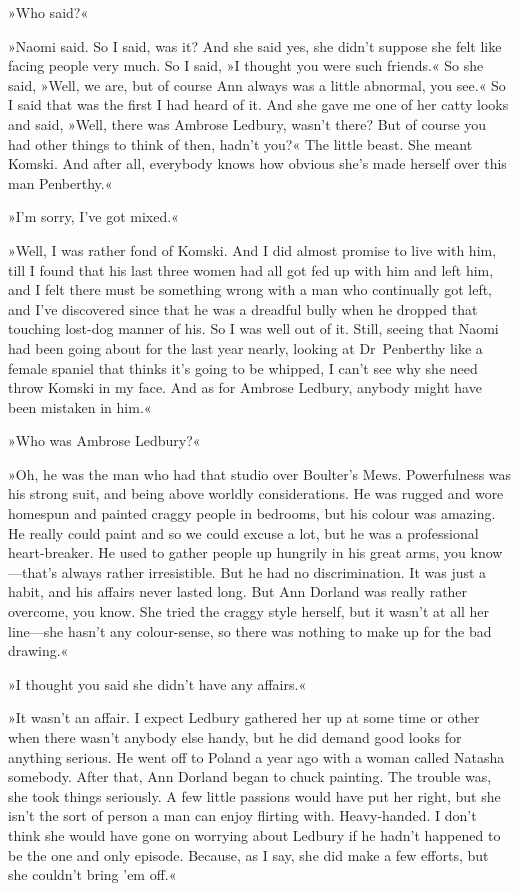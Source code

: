 »Who said?«

»Naomi said. So I said, was it? And she said yes, she didn't suppose she felt like facing people very much. So I said, »I thought you were such friends.« So she said, »Well, we are, but of course Ann always was a little abnormal, you see.« So I said that was the first I had heard of it. And she gave me one of her catty looks and said, »Well, there was Ambrose Ledbury, wasn't there? But of course you had other things to think of then, hadn't you?« The little beast. She meant Komski. And after all, everybody knows how obvious she's made herself over this man Penberthy.«

»I'm sorry, I've got mixed.«

»Well, I was rather fond of Komski. And I did almost promise to live with him, till I found that his last three women had all got fed up with him and left him, and I felt there must be something wrong with a man who continually got left, and I've discovered since that he was a dreadful bully when he dropped that touching lost-dog manner of his. So I was well out of it. Still, seeing that Naomi had been going about for the last year nearly, looking at Dr~Penberthy like a female spaniel that thinks it's going to be whipped, I can't see why she need throw Komski in my face. And as for Ambrose Ledbury, anybody might have been mistaken in him.«

»Who was Ambrose Ledbury?«

»Oh, he was the man who had that studio over Boulter's Mews. Powerfulness was his strong suit, and being above worldly considerations. He was rugged and wore homespun and painted craggy people in bedrooms, but his colour was amazing. He really could paint and so we could excuse a lot, but he was a professional heart-breaker. He used to gather people up hungrily in his great arms, you know—that's always rather irresistible. But he had no discrimination. It was just a habit, and his affairs never lasted long. But Ann Dorland was really rather overcome, you know. She tried the craggy style herself, but it wasn't at all her line—she hasn't any colour-sense, so there was nothing to make up for the bad drawing.«

»I thought you said she didn't have any affairs.«

»It wasn't an affair. I expect Ledbury gathered her up at some time or other when there wasn't anybody else handy, but he did demand good looks for anything serious. He went off to Poland a year ago with a woman called Natasha somebody. After that, Ann Dorland began to chuck painting. The trouble was, she took things seriously. A few little passions would have put her right, but she isn't the sort of person a man can enjoy flirting with. Heavy-handed. I don't think she would have gone on worrying about Ledbury if he hadn't happened to be the one and only episode. Because, as I say, she did make a few efforts, but she couldn't bring 'em off.«

